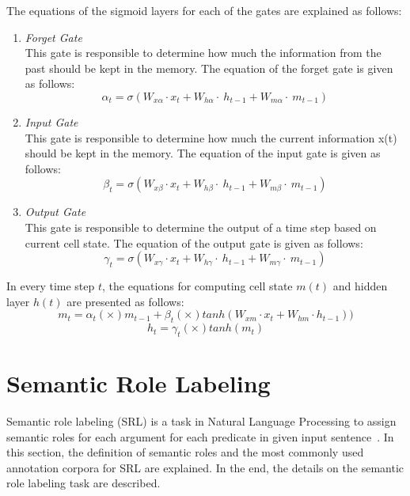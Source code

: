 The equations of the sigmoid layers for each of the gates are explained as follows:
\begin{enumerate}
	\item \textit{Forget Gate}\\
	This gate is responsible to determine how much the information from the past should be kept in the memory. The equation of the forget gate is given as follows:
	\begin{equation}\label{eq:forget_lstm}
	\alpha_{t}=\sigma(W_{x\alpha}\cdot x_{t}+W_{h\alpha}\cdot~h_{t-1}+W_{m\alpha}\cdot~m_{t-1})
	\end{equation}
	
	\item \textit{Input Gate}\\
	This gate is responsible to determine how much the current information x(t) should be kept in the memory. The equation of the input gate is given as follows:
	\begin{equation}\label{eq:input_lstm}
	\beta_{t}=\sigma(W_{x\beta}\cdot x_{t}+W_{h\beta}\cdot~h_{t-1}+W_{m\beta}\cdot~m_{t-1})
	\end{equation}
	
	\item \textit{Output Gate}\\
	This gate is responsible to determine the output of a time step based on current cell state. The equation of the output gate is given as follows:
	\begin{equation}\label{eq:output_lstm}
	\gamma_{t}=\sigma(W_{x\gamma}\cdot x_{t}+W_{h\gamma}\cdot~h_{t-1}+W_{m\gamma}\cdot~m_{t-1})
	\end{equation}
	
\end{enumerate}

In every time step $t$, the equations for computing cell state $m(t)$ and hidden layer $h(t)$ are presented as follows:
\begin{equation}\label{eq:mt}
m_{t}=\alpha_{t} (\times) m_{t-1} + \beta_{t} (\times) tanh(W_{xm} \cdot x_{t} + W_{hm} \cdot h_{t-1}))
\end{equation}
\begin{equation}\label{eq:ht}
h_{t}=\gamma_{t} (\times) tanh(m_{t})
\end{equation}

\section{Semantic Role Labeling}
Semantic role labeling (SRL) is a task in Natural Language Processing to assign semantic roles for each argument for each predicate in given input sentence~\citep{jurafsky2016speech}. In this section, the definition of semantic roles and the most commonly used annotation corpora for SRL are explained. In the end, the details on the semantic role labeling task are described.

